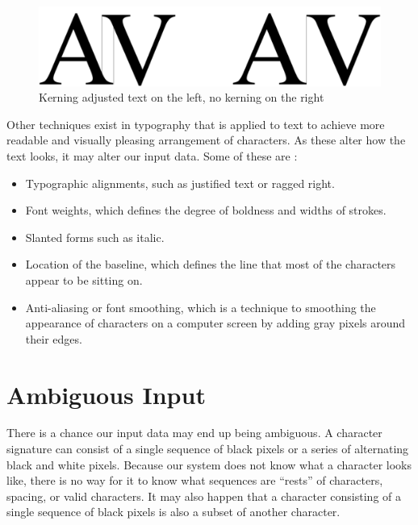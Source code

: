\begin{figure}[ht]
    \centering
    \includegraphics[width=1.0\textwidth]{fig/chapter2/kerning.png}
    \caption{Kerning adjusted text on the left, no kerning on the right}
    \label{fig:kerning-comparison}
\end{figure}

Other techniques exist in typography that is applied to text to achieve more readable and visually pleasing arrangement of characters. As these alter how the text looks, it may alter our input data. Some of these are \citep{felici2011complete}:

\begin{itemize}
    \item Typographic alignments, such as justified text or ragged right.
    \item Font weights, which defines the degree of boldness and widths of strokes.
    \item Slanted forms such as italic.
    \item Location of the baseline, which defines the line that most of the characters appear to be sitting on.
    \item Anti-aliasing or font smoothing, which is a technique to smoothing the appearance of characters on a computer screen by adding gray pixels around their edges.
\end{itemize}


\section{Ambiguous Input}
\label{sec:ambiguous_input}
There is a chance our input data may end up being ambiguous. A character signature can consist of a single sequence of black pixels or a series of alternating black and white pixels. Because our system does not know what a character looks like, there is no way for it to know what sequences are ``rests'' of characters, spacing, or valid characters. It may also happen that a character consisting of a single sequence of black pixels is also a subset of another character. 


